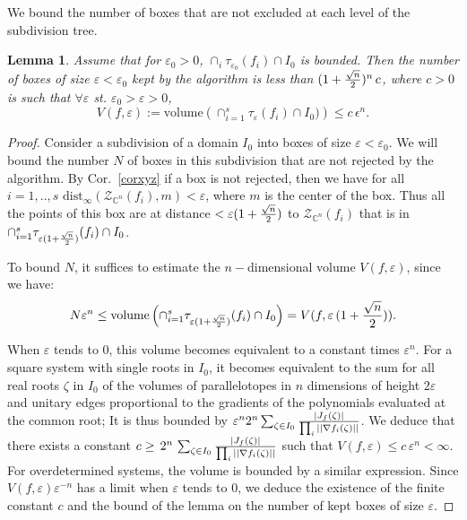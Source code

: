 \documentclass{sig-alternate}
\newtheorem{lemma}[theorem]{Lemma}
\newcommand{\dott}{{..}}
\def\CC{{\mathbb C}} \def\NN{{\mathbb N}} \def\PP{{\mathbb P}}
\begin{document}
We bound the number of boxes that are not excluded at each level of the subdivision tree.
\begin{lemma} Assume that for $\varepsilon_{0}>0$,
  $\cap_{i}{\tau}_{\varepsilon_{0}}(f_{i})\cap I_{0}$ is bounded.
Then the number of boxes of size $\varepsilon<\varepsilon_{0}$ kept by the algorithm
is less than  $(1+{\sqrt{n}\over 2})^{n}\, c$, where $c>0$ is such that
  $\forall \varepsilon$ st. $\varepsilon_{0}>\varepsilon>0$,
$$ 
V(f, \varepsilon) := \mathrm{volume}\left(\cap_{i=1}^s \tau_\varepsilon (f_i) \cap
I_{0}) \right)
\leq c\, \epsilon^{n}.
$$
\end{lemma}
\begin{proof}
  Consider a subdivision of a domain $I_0$ into boxes of size
  $\varepsilon<\varepsilon_{0}$. We will bound the number $N$ of boxes in this
  subdivision that are not rejected by the algorithm. By
  Cor.~\ref{corxyz} if a box is not rejected, then we have for all
  $i=1,\dott,s$ $\text{dist}_{\infty}(\mathcal Z_{\CC^n}(f_i),
  m)<\varepsilon$, where $m$ is the center of the box.
  Thus all the points of this box are at distance $< \varepsilon (1+
  {\sqrt{n}\over 2})$ to $\mathcal Z_{\CC^n}(f_i)$
that is in $\cap_{i=1}^s \tau_{\varepsilon (1+
  {\sqrt{n}\over 2})}(f_i) \cap I_{0}$.

To bound $N$, it suffices to estimate the $n-$dimensional volume $V(f, 
  \varepsilon)$, since we have:
$$ 
N\varepsilon^{n} \leq \mathrm{volume}\left(\cap_{i=1}^s \tau_{ \varepsilon (1+
  {\sqrt{n}\over 2})}(f_i)\cap I_{0}\right)=V(f, 
  \varepsilon\,(1+ {\sqrt{n}\over 2}) ).
$$
 
When $\varepsilon$ tends to $0$, this volume becomes equivalent to a
constant times $\varepsilon^{n}$. For a square system with single
roots in $I_{0}$, it becomes equivalent to the sum for all real roots
$\zeta$ in $I_{0}$ of the volumes of parallelotopes in $n$ dimensions
of height $2\varepsilon$ and unitary edges proportional to the
gradients of the polynomials evaluated at the common root; It is thus
bounded by $\varepsilon^n 2^{n} \sum_{\zeta \in I_{0}} {|J_{f}(\zeta)|
  \over \prod_{i}||\nabla f_{i}(\zeta)||}$. We deduce that there
exists a constant $c \ge\, 2^{n}\, \sum_{\zeta \in I_{0}}
{|J_{f}(\zeta)| \over \prod_{i}||\nabla f_{i}(\zeta)||}$ such that
$V(f, \varepsilon)\le c\, \varepsilon^{n} < \infty$. For
overdetermined systems, the volume is bounded by a similar
expression. Since $V(f, \varepsilon) \varepsilon^{-n}$ has a limit
when $\varepsilon$ tends to $0$, we deduce the existence of the finite
constant $c$ and the bound of the lemma on the number of kept boxes of
size $\varepsilon$.
\end{proof}
\end{document}
